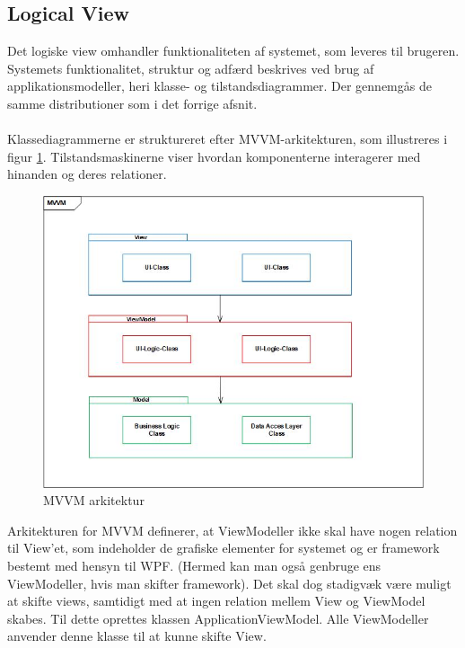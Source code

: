 \documentclass[Rapport/Rapport_main.tex]{subfiles}
\begin{document}
\subsection{Logical View}
Det logiske view omhandler funktionaliteten af systemet, som leveres til brugeren. Systemets funktionalitet, struktur og adfærd beskrives ved brug af applikationsmodeller, heri klasse- og tilstandsdiagrammer. Der gennemgås de samme distributioner som i det forrige afsnit. \\\\
Klassediagrammerne er struktureret efter MVVM-arkitekturen, som illustreres i figur \ref{fig:MVVM_arch}. Tilstandsmaskinerne viser hvordan komponenterne interagerer med hinanden og deres relationer. 
\begin{figure}[H]
    \centering
    \includegraphics[width=\textwidth]{Rapport/Arkitektur/4+1/Logical/graphics/MVVMsketch.jpg}
    \caption{MVVM arkitektur}
    \label{fig:MVVM_arch}
\end{figure}
\noindent Arkitekturen for MVVM definerer, at ViewModeller ikke skal have nogen relation til View'et, som indeholder de grafiske elementer for systemet og er framework bestemt med hensyn til WPF. (Hermed kan man også genbruge ens ViewModeller, hvis man skifter framework). Det skal dog stadigvæk være muligt at skifte views, samtidigt med at ingen relation mellem View og ViewModel skabes. Til dette oprettes klassen ApplicationViewModel. Alle ViewModeller anvender denne klasse til at kunne skifte View.  
\end{document}

